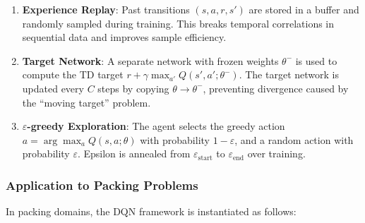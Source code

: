 \begin{enumerate}
\item \textbf{Experience Replay}: Past transitions $(s, a, r, s')$ are stored in a buffer and randomly sampled during training. This breaks temporal correlations in sequential data and improves sample efficiency.

\item \textbf{Target Network}: A separate network with frozen weights $\theta^-$ is used to compute the TD target $r + \gamma \max_{a'} Q(s', a'; \theta^-)$. The target network is updated every $C$ steps by copying $\theta \to \theta^-$, preventing divergence caused by the ``moving target'' problem.

\item \textbf{$\varepsilon$-greedy Exploration}: The agent selects the greedy action $a = \arg\max_a Q(s, a; \theta)$ with probability $1 - \varepsilon$, and a random action with probability $\varepsilon$. Epsilon is annealed from $\varepsilon_{\text{start}}$ to $\varepsilon_{\text{end}}$ over training.
\end{enumerate}

\subsubsection{Application to Packing Problems}

In packing domains, the DQN framework is instantiated as follows:

